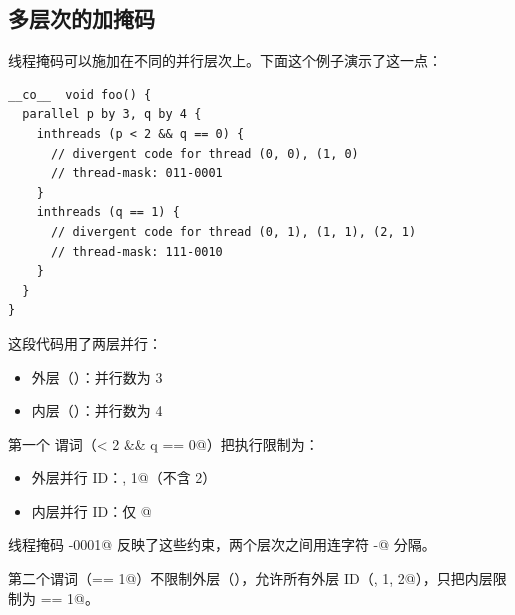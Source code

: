 \subsection*{多层次的加掩码}

线程掩码可以施加在不同的并行层次上。下面这个例子演示了这一点：

\begin{lstlisting}[language=croqtile,caption={多层次的加掩码}]
__co__  void foo() {
  parallel p by 3, q by 4 {
    inthreads (p < 2 && q == 0) {
      // divergent code for thread (0, 0), (1, 0)
      // thread-mask: 011-0001
    }
    inthreads (q == 1) {
      // divergent code for thread (0, 1), (1, 1), (2, 1)
      // thread-mask: 111-0010
    }
  }
}
\end{lstlisting}

这段代码用了两层并行：

\begin{itemize}[leftmargin=1.6em]
\item 外层（\co@p@）：并行数为 3
\item 内层（\co@q@）：并行数为 4
\end{itemize}

第一个 \co@inthreads@ 谓词（\co@p < 2 && q == 0@）把执行限制为：

\begin{itemize}[leftmargin=1.6em]
\item 外层并行 ID：, 1@（不含 2）
\item 内层并行 ID：仅 @
\end{itemize}

线程掩码 -0001@ 反映了这些约束，两个层次之间用连字符 \co@-@ 分隔。

第二个谓词（\co@q == 1@）不限制外层（\co@p@），允许所有外层 ID（, 1, 2@），只把内层限制为 \co@q == 1@。
